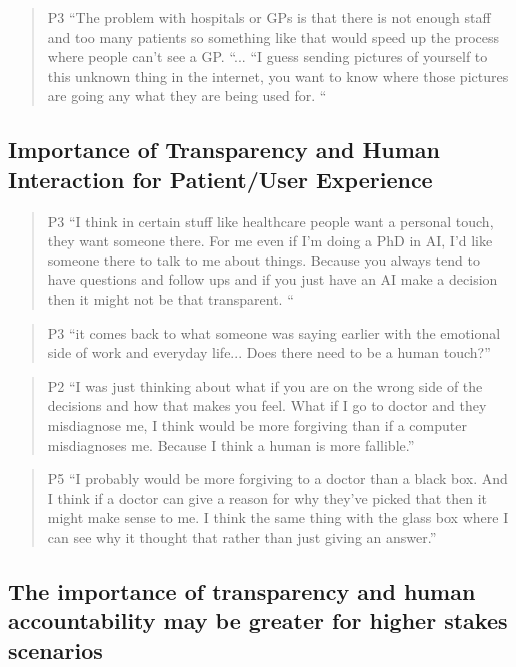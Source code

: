 \documentclass[manuscript,screen,review]{acmart}
\begin{document}
\begin{quote}
P3 “The problem with hospitals or GPs is that there is not enough staff and too many patients so something like that would speed up the process where people can’t see a GP. “... “I guess sending pictures of yourself to this unknown thing in the internet, you want to know where those pictures are going any what they are being used for. “
\end{quote}


\subsection{Importance of Transparency and Human Interaction for Patient/User Experience}

\begin{quote}
P3 “I think in certain stuff like healthcare people want a personal touch, they want someone there. For me even if I'm doing a PhD in AI, I'd like someone there to talk to me about things. Because you always tend to have questions and follow ups and if you just have an AI make a decision then it might not be that transparent. “
\end{quote}

\begin{quote}
P3 “it comes back to what someone was saying earlier with the emotional side of work and everyday life... Does there need to be a human touch?”
\end{quote}


\begin{quote}
P2 “I was just thinking about what if you are on the wrong side of the decisions and how that makes you feel. What if I go to doctor and they misdiagnose me, I think would be more forgiving than if a computer misdiagnoses me. Because I think a human is more fallible.”
\end{quote}
\begin{quote}
P5 “I probably would be more forgiving to a doctor than a black box. And I think if a doctor can give a reason for why they’ve picked that then it might make sense to me. I think the same thing with the glass box where I can see why it thought that rather than just giving an answer.”
\end{quote}


\subsection{The importance of transparency and human accountability may be greater for higher stakes scenarios}
\end{document}
